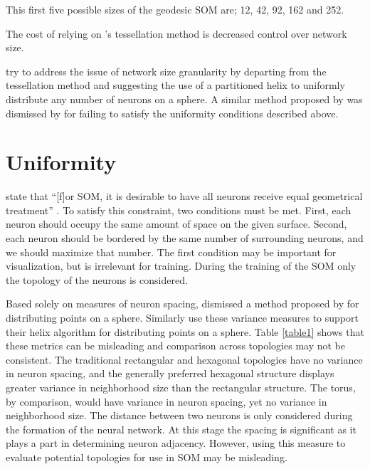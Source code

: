 This first five possible sizes of the geodesic SOM are; 12, 42, 92, 162 and 252.  

The cost of relying on \citeauthor{ritter99}'s tessellation method is
decreased control over network size. 




\cite{Nishio:2006fk} try to address the
issue of network size granularity by departing from the tessellation method and
suggesting the use of a partitioned helix to uniformly distribute any number of
neurons on a sphere.  A similar method proposed by \cite{Rakhmanov94} was
dismissed by \cite{wu2005} for failing to satisfy the uniformity conditions
described above.


\section{Uniformity}
\citeauthor{wu2006} state that ``[f]or SOM, it is desirable to have all neurons
receive equal geometrical treatment'' \cite[p. 900]{wu2006}.  To satisfy this
constraint, two conditions must be met.  First, each neuron should occupy the
same amount of space on the given surface.  Second, each neuron should be
bordered by the same number of surrounding neurons, and we should maximize that
number.  The first condition may be important for visualization, but is
irrelevant for training.  During the training of the SOM only the topology of
the neurons is considered.

Based solely on measures of neuron spacing, \cite{wu2005} dismissed a method
proposed by \cite{Rakhmanov94} for distributing points on a sphere.  Similarly
\cite{Nishio:2006fk} use these variance measures to support their helix
algorithm for distributing points on a sphere.  Table \ref{table1} shows that
these metrics can be misleading and comparison across topologies may not be
consistent.
The traditional rectangular and hexagonal topologies have no variance in neuron
spacing, and the generally preferred hexagonal structure displays greater
variance in neighborhood size than the rectangular structure.  The torus, by
comparison, would have variance in neuron spacing, yet no variance in
neighborhood size.  The distance between two neurons is only considered during
the formation of the neural network.  At this stage the spacing is significant
as it plays a part in determining neuron adjacency. However, using this measure
to evaluate potential topologies for use in SOM may be misleading.

